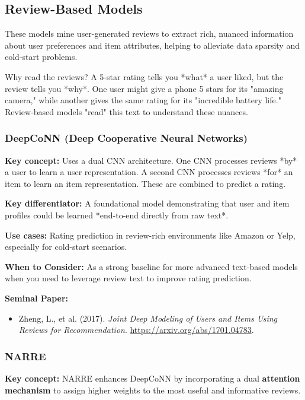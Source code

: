 \documentclass{article}
\begin{document}
    \subsection{Review-Based Models}
    These models mine user-generated reviews to extract rich, nuanced information about user preferences and item attributes, helping to alleviate data sparsity and cold-start problems.
    
    \begin{asidebox}{Why read the reviews?}
    A 5-star rating tells you *what* a user liked, but the review tells you *why*. One user might give a phone 5 stars for its "amazing camera," while another gives the same rating for its "incredible battery life." Review-based models "read" this text to understand these nuances.
    \end{asidebox}
    
    \subsubsection{DeepCoNN (Deep Cooperative Neural Networks)}
\noindent\textbf{Key concept:} Uses a dual CNN architecture. One CNN processes reviews *by* a user to learn a user representation. A second CNN processes reviews *for* an item to learn an item representation. These are combined to predict a rating.

\noindent\textbf{Key differentiator:} A foundational model demonstrating that user and item profiles could be learned *end-to-end directly from raw text*.

\noindent\textbf{Use cases:} Rating prediction in review-rich environments like Amazon or Yelp, especially for cold-start scenarios.

\noindent\textbf{When to Consider:} As a strong baseline for more advanced text-based models when you need to leverage review text to improve rating prediction.

\noindent\textbf{Seminal Paper:}
    \begin{itemize}
        \item Zheng, L., et al. (2017). \textit{Joint Deep Modeling of Users and Items Using Reviews for Recommendation}. \url{https://arxiv.org/abs/1701.04783}.
    \end{itemize}

    \subsubsection{NARRE}
\noindent\textbf{Key concept:} NARRE enhances DeepCoNN by incorporating a dual \textbf{attention mechanism} to assign higher weights to the most useful and informative reviews.
\end{document}

